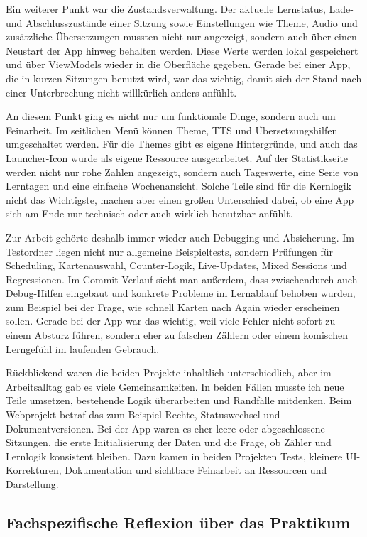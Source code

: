 \documentclass{Vorlage}
\begin{document}
Ein weiterer Punkt war die Zustandsverwaltung. Der aktuelle Lernstatus, Lade- und Abschlusszust\"ande einer Sitzung sowie Einstellungen wie Theme, Audio und zus\"atzliche \"Ubersetzungen mussten nicht nur angezeigt, sondern auch \"uber einen Neustart der App hinweg behalten werden. Diese Werte werden lokal gespeichert und \"uber ViewModels wieder in die Oberfl\"ache gegeben. Gerade bei einer App, die in kurzen Sitzungen benutzt wird, war das wichtig, damit sich der Stand nach einer Unterbrechung nicht willk\"urlich anders anf\"uhlt.

An diesem Punkt ging es nicht nur um funktionale Dinge, sondern auch um Feinarbeit. Im seitlichen Men\"u k\"onnen Theme, TTS und \"Ubersetzungshilfen umgeschaltet werden. F\"ur die Themes gibt es eigene Hintergr\"unde, und auch das Launcher-Icon wurde als eigene Ressource ausgearbeitet. Auf der Statistikseite werden nicht nur rohe Zahlen angezeigt, sondern auch Tageswerte, eine Serie von Lerntagen und eine einfache Wochenansicht. Solche Teile sind f\"ur die Kernlogik nicht das Wichtigste, machen aber einen gro\ss{}en Unterschied dabei, ob eine App sich am Ende nur technisch oder auch wirklich benutzbar anf\"uhlt.

Zur Arbeit geh\"orte deshalb immer wieder auch Debugging und Absicherung. Im Testordner liegen nicht nur allgemeine Beispieltests, sondern Pr\"ufungen f\"ur Scheduling, Kartenauswahl, Counter-Logik, Live-Updates, Mixed Sessions und Regressionen. Im Commit-Verlauf sieht man au\ss{}erdem, dass zwischendurch auch Debug-Hilfen eingebaut und konkrete Probleme im Lernablauf behoben wurden, zum Beispiel bei der Frage, wie schnell Karten nach Again wieder erscheinen sollen. Gerade bei der App war das wichtig, weil viele Fehler nicht sofort zu einem Absturz f\"uhren, sondern eher zu falschen Z\"ahlern oder einem komischen Lerngef\"uhl im laufenden Gebrauch.

R\"uckblickend waren die beiden Projekte inhaltlich unterschiedlich, aber im Arbeitsalltag gab es viele Gemeinsamkeiten. In beiden F\"allen musste ich neue Teile umsetzen, bestehende Logik \"uberarbeiten und Randf\"alle mitdenken. Beim Webprojekt betraf das zum Beispiel Rechte, Statuswechsel und Dokumentversionen. Bei der App waren es eher leere oder abgeschlossene Sitzungen, die erste Initialisierung der Daten und die Frage, ob Z\"ahler und Lernlogik konsistent bleiben. Dazu kamen in beiden Projekten Tests, kleinere UI-Korrekturen, Dokumentation und sichtbare Feinarbeit an Ressourcen und Darstellung.

\subsection{Fachspezifische Reflexion \"uber das Praktikum}
\end{document}
